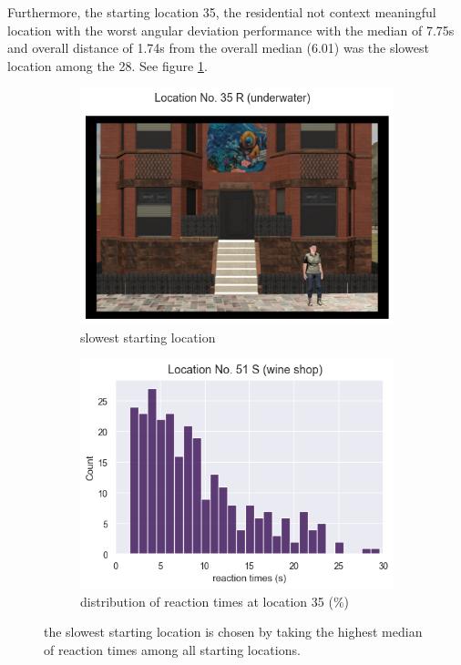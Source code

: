 Furthermore, the starting location 35, the residential not context meaningful location with the worst angular deviation performance with the median of 7.75s and overall distance of 1.74s from the overall median (6.01) was the slowest location among the 28. See figure \ref{fig:slowest_loc}.

\begin{figure}[!h]
	\begin{subfigure}[b]{0.48\linewidth}
		\includegraphics[width=\linewidth]{figures/worst_loc_angular_error__withHA_23.png}
		\caption{slowest starting location}
		\label{fig:slowest_loc}
	\end{subfigure}
	\begin{subfigure}[b]{0.48\linewidth}
		\includegraphics[width=\linewidth]{figures/slowest_loc_RT_dist_35_23.png}
		\caption{distribution of reaction times at location 35 (\%)}
		\label{fig:best_angular_dist_35}
	\end{subfigure}
	
	\caption[Slowest starting location]{the slowest starting location is chosen by taking the highest median of reaction times among all starting locations.}
\end{figure}
\label{fig:slowest_location}


